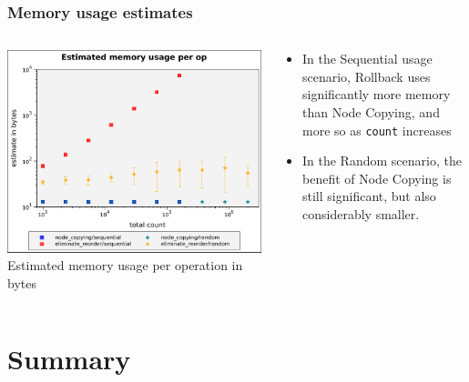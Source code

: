 \documentclass{beamer}
\begin{document}
\begin{frame}
\frametitle{Memory usage estimates}
\begin{columns}[t]
  \begin{column}{0.55\textwidth}

    \includegraphics[height=0.65\textheight]{figures/graphs/space-results-per-op.pdf}
    \newline Estimated memory usage per operation in bytes
  \end{column}

  \begin{column}{0.50\textwidth}

    \begin{itemize}

      \item In the Sequential usage scenario, Rollback uses significantly more
      memory than Node Copying, and more so as \texttt{count} increases

      \item In the Random scenario, the benefit of Node Copying is still
      significant, but also considerably smaller.

    \end{itemize}

  \end{column}
\end{columns}
\end{frame}

\section*{Summary}
\end{document}
